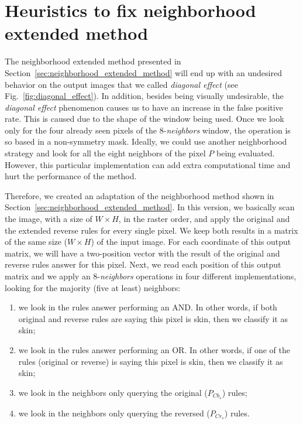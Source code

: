 \section{Heuristics to fix neighborhood extended method}
\label{sec:sup_neighborhood_operations}
The neighborhood extended method presented in Section~\ref{sec:neighborhood_extended_method} will end up with an undesired behavior on the output images that we called \textit{diagonal effect} (see Fig.~\ref{fig:diagonal_effect}). In addition, besides being visually undesirable, the \textit{diagonal effect} phenomenon causes us to have an increase in the false positive rate. This is caused due to the shape of the window being used. Once we look only for the four already seen pixels of the 8-\textit{neighbors} window, the operation is so based in a non-symmetry mask. Ideally, we could use another neighborhood strategy and look for all the eight neighbors of the pixel $P$ being evaluated. However, this particular implementation can add extra computational time and hurt the performance of the method. 

Therefore, we created an adaptation of the neighborhood method shown in Section~\ref{sec:neighborhood_extended_method}. In this version, we basically scan the image, with a size of $W \times H$, in the raster order, and apply the original and the extended reverse rules for every single pixel. We keep both results in a matrix of the same size ($W \times H$) of the input image. For each coordinate of this output matrix, we will have a two-position vector with the result of the original and reverse rules answer for this pixel. Next, we read each position of this output matrix and we apply an 8-\textit{neighbors} operations in four different implementations, looking for the majority (five at least) neighbors:

\begin{enumerate}[label={(\arabic*)}]
    \item we look in the rules answer performing an AND. In other words, if both original and reverse rules are saying this pixel is skin, then we classify it as skin;
    \item we look in the rules answer performing an OR. In other words, if one of the rules (original or reverse) is saying this pixel is skin, then we classify it as skin;
    \item we look in the neighbors only querying the original ($P_{Cb_s}$) rules;
    \item we look in the neighbors only querying the reversed ($P_{Cr_s}$) rules.
\end{enumerate}

